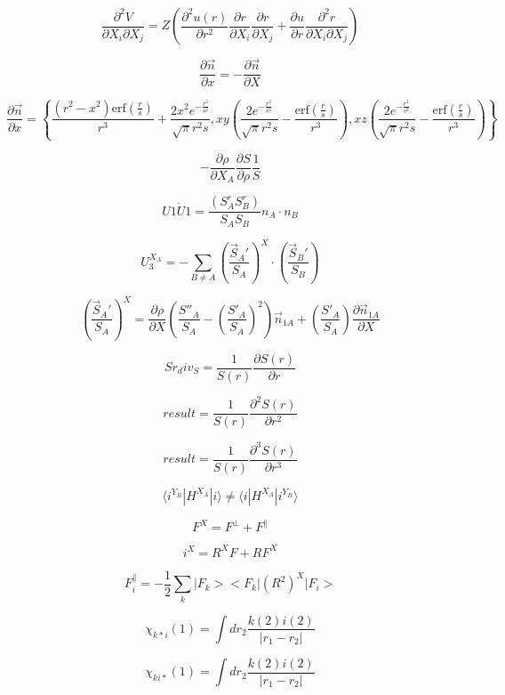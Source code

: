 \documentclass{article}
\begin{document}
\[\frac{\partial^2 V}{\partial X_i\partial X_j}
  =  Z \left(\frac{\partial^2 u(r)}{\partial r^2} \frac{\partial r}{\partial X_i}
     \frac{\partial r}{\partial X_j} + \frac{\partial u}{\partial r}
     \frac{\partial^2 r}{\partial X_i \partial X_j}\right)
\]
\pagebreak

\[    \frac{\partial \vec n}{\partial x}  = -\frac{\partial \vec n}{\partial X}
\]
\pagebreak

\[\frac{\partial\vec n}{\partial x} =
\left\{\frac{\left(r^2-x^2\right) \mathrm{erf}\left(\frac{r}{s}\right)}{r^3}
   +\frac{2 x^2 e^{-\frac{r^2}{s^2}}}{\sqrt{\pi } r^2 s},
 x y \left(\frac{2 e^{-\frac{r^2}{s^2}}}{\sqrt{\pi } r^2 s}
   -\frac{\mathrm{erf}\left(\frac{r}{s}\right)}{r^3}\right),
 x z \left(\frac{2 e^{-\frac{r^2}{s^2}}}{\sqrt{\pi } r^2 s}
   -\frac{\mathrm{erf}\left(\frac{r}{s}\right)}{r^3}\right)\right\}
\]
\pagebreak

\[ -\frac{\partial \rho}{\partial X_A}\frac{\partial S}{\partial \rho}\frac{1}{S}
\]
\pagebreak

\[ U1\dot U1 = \frac{\left(S^r_A S^r_B\right)}{S_A S_B} n_A \cdot n_B
\]
\pagebreak

\[U_3^{X_A} = -\sum_{B\neq A}\left(\frac{\vec S_A'}{S_A}\right)^X\cdot\left(\frac{\vec S_B'}{S_B}\right)
\]
\pagebreak

\[\left(\frac{\vec S_A'}{S_A}\right)^X =
    \frac{\partial \rho}{\partial X}\left(\frac{S''_A}{S_A}
         -\left(\frac{S'_A}{S_A}\right)^2\right)\vec n_{1A}
    + \left(\frac{S'_A}{S_A}\right)\frac{\partial \vec n_{1A}}{\partial X}
\]
\pagebreak

\[    Sr_div_S = \frac{1}{S(r)}\frac{\partial S(r)}{\partial r}
\]
\pagebreak

\[    result = \frac{1}{S(r)}\frac{\partial^2 S(r)}{\partial r^2}
\]
\pagebreak

\[   result = \frac{1}{S(r)}\frac{\partial^3 S(r)}{\partial r^3}
\]
\pagebreak

\[ \langle i^{Y_B}|H^{X_A}|i\rangle \neq \langle i|H^{X_A}|i^{Y_B}\rangle
\]
\pagebreak

\[    F^X = F^\perp + F^\parallel
\]
\pagebreak

\[  i^X   = R^X F + R F^X
\]
\pagebreak

\[ F_i^\parallel = -\frac{1}{2}\sum_k|F_k ><F_k | (R^2)^X | F_i>
\]
\pagebreak

\[ \chi_{k{*} i}(1) = \int dr_2 \frac{k(2) i(2)}{|r_1-r_2|} \]
\pagebreak

\[ \chi_{ki{*}}(1) = \int dr_2 \frac{k(2) i(2)}{|r_1-r_2|} \]
\pagebreak
\end{document}
